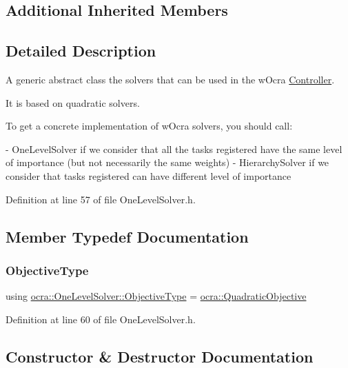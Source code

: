 \subsection*{Additional Inherited Members}


\subsection{Detailed Description}
A generic abstract class the solvers that can be used in the w\+Ocra \hyperlink{classocra_1_1Controller}{Controller}. 

It is based on quadratic solvers.

To get a concrete implementation of w\+Ocra solvers, you should call\+: \begin{DoxyVerb} - OneLevelSolver if we consider that all the tasks registered have the same level of importance (but not necessarily the same weights)
 - HierarchySolver if we consider that tasks registered can have different level of importance\end{DoxyVerb}
 

Definition at line 57 of file One\+Level\+Solver.\+h.



\subsection{Member Typedef Documentation}
\hypertarget{classocra_1_1OneLevelSolver_a93b0be052a859bbd4c81584aa1646ffb}{}\label{classocra_1_1OneLevelSolver_a93b0be052a859bbd4c81584aa1646ffb} 
\subsubsection{\texorpdfstring{Objective\+Type}{ObjectiveType}}
{\footnotesize\ttfamily using \hyperlink{classocra_1_1OneLevelSolver_a93b0be052a859bbd4c81584aa1646ffb}{ocra\+::\+One\+Level\+Solver\+::\+Objective\+Type} =  \hyperlink{namespaceocra_a0b50673710f087c0f1733aefd1a8e0f7}{ocra\+::\+Quadratic\+Objective}}



Definition at line 60 of file One\+Level\+Solver.\+h.



\subsection{Constructor \& Destructor Documentation}
\hypertarget{classocra_1_1OneLevelSolver_a588397d9d887af06a5b88dcdb00d7f49}{}\label{classocra_1_1OneLevelSolver_a588397d9d887af06a5b88dcdb00d7f49} 
